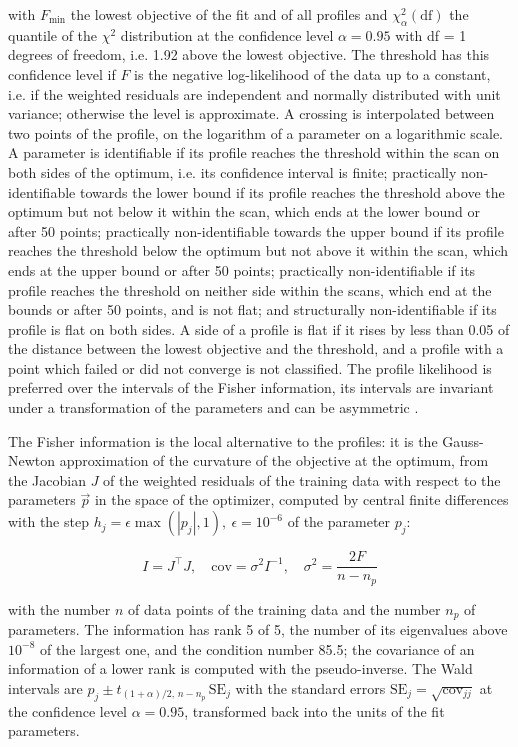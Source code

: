 with $F_{\min}$ the lowest objective of the fit and of all profiles and $\chi^2_{\alpha}(\mathrm{df})$ the quantile of the $\chi^2$ distribution at the confidence level $\alpha = 0.95$ with df = 1 degrees of freedom, i.e. 1.92 above the lowest objective. The threshold has this confidence level if $F$ is the negative log-likelihood of the data up to a constant, i.e. if the weighted residuals are independent and normally distributed with unit variance; otherwise the level is approximate. A crossing is interpolated between two points of the profile, on the logarithm of a parameter on a logarithmic scale. A parameter is identifiable if its profile reaches the threshold within the scan on both sides of the optimum, i.e. its confidence interval is finite; practically non-identifiable towards the lower bound if its profile reaches the threshold above the optimum but not below it within the scan, which ends at the lower bound or after 50 points; practically non-identifiable towards the upper bound if its profile reaches the threshold below the optimum but not above it within the scan, which ends at the upper bound or after 50 points; practically non-identifiable if its profile reaches the threshold on neither side within the scans, which end at the bounds or after 50 points, and is not flat; and structurally non-identifiable if its profile is flat on both sides. A side of a profile is flat if it rises by less than 0.05 of the distance between the lowest objective and the threshold, and a profile with a point which failed or did not converge is not classified. The profile likelihood is preferred over the intervals of the Fisher information, its intervals are invariant under a transformation of the parameters and can be asymmetric \cite{Wieland2021}.

The Fisher information is the local alternative to the profiles: it is the Gauss-Newton approximation of the curvature of the objective at the optimum, from the Jacobian $J$ of the weighted residuals of the training data with respect to the parameters $\vec{p}$ in the space of the optimizer, computed by central finite differences with the step $h_j = \epsilon \max(|p_j|, 1),\ \epsilon = 10^{-6}$ of the parameter $p_j$:

\begin{equation}
I = J^\top J, \quad \mathrm{cov} = \sigma^2 I^{-1}, \quad \sigma^2 = \frac{2 F}{n - n_p}
\end{equation}

with the number $n$ of data points of the training data and the number $n_p$ of parameters. The information has rank 5 of 5, the number of its eigenvalues above $10^{-8}$ of the largest one, and the condition number 85.5; the covariance of an information of a lower rank is computed with the pseudo-inverse. The Wald intervals are $\hat{p}_j \pm t_{(1+\alpha)/2,\, n-n_p}\, \mathrm{SE}_j$ with the standard errors $\mathrm{SE}_j = \sqrt{\mathrm{cov}_{jj}}$ at the confidence level $\alpha = 0.95$, transformed back into the units of the fit parameters.

